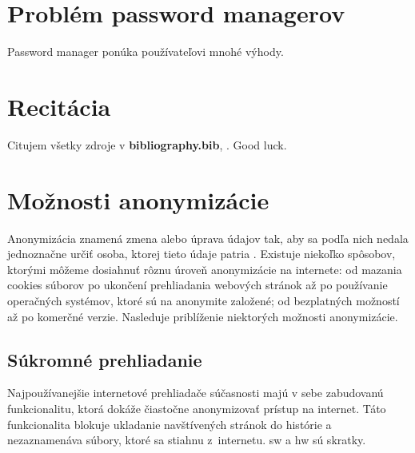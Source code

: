 \section{Problém password managerov}
Password manager ponúka používateľovi mnohé výhody. 


\section{Recitácia}
Citujem všetky zdroje v \textbf{bibliography.bib}, \cite{t00, t01, t02, t03, kniha, kniha2, kniha3, small, big, cs, koll, kap, tug, knuth, zbornik, prispevok}. \newline Good luck.
\section{Možnosti anonymizácie}
\noindent Anonymizácia znamená zmena alebo úprava údajov tak, aby sa podľa nich nedala jednoznačne určiť osoba, ktorej tieto údaje patria \cite{t01}. Existuje niekoľko spôsobov, ktorými môžeme dosiahnuť rôznu úroveň anonymizácie na internete: od mazania cookies súborov po ukončení prehliadania webových stránok až po používanie operačných systémov, ktoré sú na anonymite založené; od bezplatných možností až po komerčné verzie.  
\newline Nasleduje priblíženie niektorých možnosti anonymizácie.

\subsection{Súkromné prehliadanie}
\noindent Najpoužívanejšie internetové prehliadače súčasnosti majú v sebe zabudovanú funkcionalitu, ktorá dokáže čiastočne anonymizovať prístup na internet. Táto funkcionalita blokuje ukladanie navštívených stránok do histórie a nezaznamenáva súbory, ktoré sa stiahnu z~internetu. \acrshort{sw} a \acrlong{hw} sú skratky.

